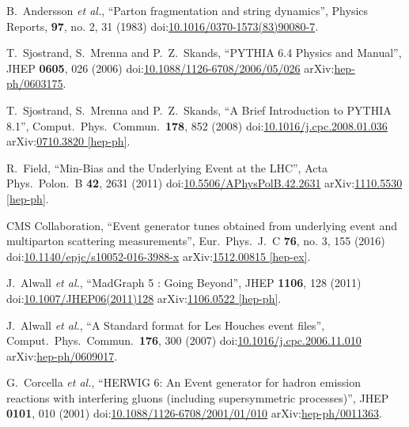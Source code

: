 \begin{thebibliography}{99}
B.~Andersson {\it et al.}, ``Parton fragmentation and string dynamics'', Physics Reports, {\bf 97}, no. 2, 31 (1983) doi:\href{http://www.sciencedirect.com/science/article/pii/0370157383900807}{10.1016/0370-1573(83)90080-7}.

T.~Sjostrand, S.~Mrenna and P.~Z.~Skands, ``PYTHIA 6.4 Physics and Manual'', JHEP {\bf 0605}, 026 (2006) doi:\href{http://dx.doi.org/10.1088/1126-6708/2006/05/026}{10.1088/1126-6708/2006/05/026} arXiv:\href{https://arxiv.org/abs/hep-ph/0603175}{hep-ph/0603175}.

T.~Sjostrand, S.~Mrenna and P.~Z.~Skands, ``A Brief Introduction to PYTHIA 8.1'', Comput.\ Phys.\ Commun.\ {\bf 178}, 852 (2008) doi:\href{http://dx.doi.org/10.1016/j.cpc.2008.01.036}{10.1016/j.cpc.2008.01.036} arXiv:\href{https://arxiv.org/abs/0710.3820L}{0710.3820 [hep-ph]}.

R.~Field, ``Min-Bias and the Underlying Event at the LHC'', Acta Phys.\ Polon.\ B {\bf 42}, 2631 (2011) doi:\href{http://dx.doi.org/10.5506/APhysPolB.42.2631}{10.5506/APhysPolB.42.2631} arXiv:\href{https://arxiv.org/abs/1110.5530}{1110.5530 [hep-ph]}. 

CMS Collaboration, ``Event generator tunes obtained from underlying event and multiparton scattering measurements'', Eur.\ Phys.\ J.\ C {\bf 76}, no. 3, 155 (2016) doi:\href{http://dx.doi.org/10.1140/epjc/s10052-016-3988-x}{10.1140/epjc/s10052-016-3988-x} arXiv:\href{https://arxiv.org/abs/1512.00815}{1512.00815 [hep-ex]}.

J.~Alwall {\it et al.}, ``MadGraph 5 : Going Beyond'', JHEP {\bf 1106}, 128 (2011) doi:\href{https://doi.org/10.1007/JHEP06(2011)128}{10.1007/JHEP06(2011)128} arXiv:\href{https://arxiv.org/abs/1106.0522}{1106.0522 [hep-ph]}.

J.~Alwall {\it et al.}, ``A Standard format for Les Houches event files'', Comput.\ Phys.\ Commun.\ {\bf 176}, 300 (2007) doi:\href{http://dx.doi.org/10.1016/j.cpc.2006.11.010}{10.1016/j.cpc.2006.11.010} arXiv:\href{https://arxiv.org/abs/hep-ph/0609017}{hep-ph/0609017}.
 
G.~Corcella {\it et al.}, ``HERWIG 6: An Event generator for hadron emission reactions with interfering gluons (including supersymmetric processes)'', JHEP {\bf 0101}, 010 (2001) doi:\href{http://dx.doi.org/10.1088/1126-6708/2001/01/010}{10.1088/1126-6708/2001/01/010} arXiv:\href{https://arxiv.org/abs/hep-ph/0011363}{hep-ph/0011363}. 
 

\end{thebibliography}
